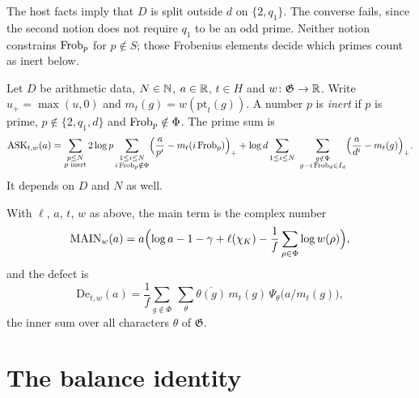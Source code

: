\begin{remark}
The host facts imply that $D$ is split outside $d$ on $\{2,q_1\}$. The converse fails, since the second notion does not require $q_1$ to be an odd prime. Neither notion constrains $\operatorname{Frob}_p$ for $p\notin S$; those Frobenius elements decide which primes count as inert below.
\end{remark}

\begin{definition}\label{bal:ask}
Let $D$ be arithmetic data, $N\in\mathbb{N}$, $a\in\mathbb{R}$, $t\in H$ and $w\colon\mathfrak G\to\mathbb{R}$. Write $u_+=\max(u,0)$ and $m_t(g)=w(\mathrm{pt}_t(g))$. A number $p$ is \emph{inert} if $p$ is prime, $p\notin\{2,q_1,d\}$ and $\operatorname{Frob}_p\notin\Phi$. The prime sum is
\[
\mathrm{ASK}_{t,w}(a)=\sum_{\substack{p\le N\\ p\text{ inert}}}2\log p\sum_{\substack{1\le i\le N\\ i\operatorname{Frob}_p\notin\Phi}}\Bigl(\frac a{p^i}-m_t(i\operatorname{Frob}_p)\Bigr)_+
+\log d\sum_{1\le i\le N}\ \sum_{\substack{g\notin\Phi\\ g-i\operatorname{Frob}_d\in I_d}}\Bigl(\frac a{d^i}-m_t(g)\Bigr)_+ .
\]
It depends on $D$ and $N$ as well.
\end{definition}

\begin{definition}\label{bal:main-defect}
With $\ell$, $a$, $t$, $w$ as above, the main term is the complex number
\[\mathrm{MAIN}_w(a)=a\Bigl(\log a-1-\gamma+\ell(\chi_K)-\frac1f\sum_{\rho\in\Phi}\log w(\rho)\Bigr),\]
and the defect is
\[\mathrm{De}_{t,w}(a)=\frac1f\sum_{g\notin\Phi}\ \sum_{\theta}\overline{\theta(g)}\,m_t(g)\,\Psi_{\theta}\bigl(a/m_t(g)\bigr),\]
the inner sum over all characters $\theta$ of $\mathfrak G$.
\end{definition}

\section{The balance identity}

